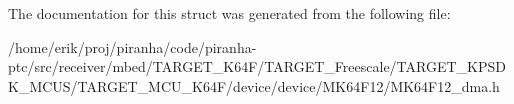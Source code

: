 The documentation for this struct was generated from the following file\+:\begin{DoxyCompactItemize}
\item 
/home/erik/proj/piranha/code/piranha-\/ptc/src/receiver/mbed/\+T\+A\+R\+G\+E\+T\+\_\+\+K64\+F/\+T\+A\+R\+G\+E\+T\+\_\+\+Freescale/\+T\+A\+R\+G\+E\+T\+\_\+\+K\+P\+S\+D\+K\+\_\+\+M\+C\+U\+S/\+T\+A\+R\+G\+E\+T\+\_\+\+M\+C\+U\+\_\+\+K64\+F/device/device/\+M\+K64\+F12/M\+K64\+F12\+\_\+dma.\+h\end{DoxyCompactItemize}
